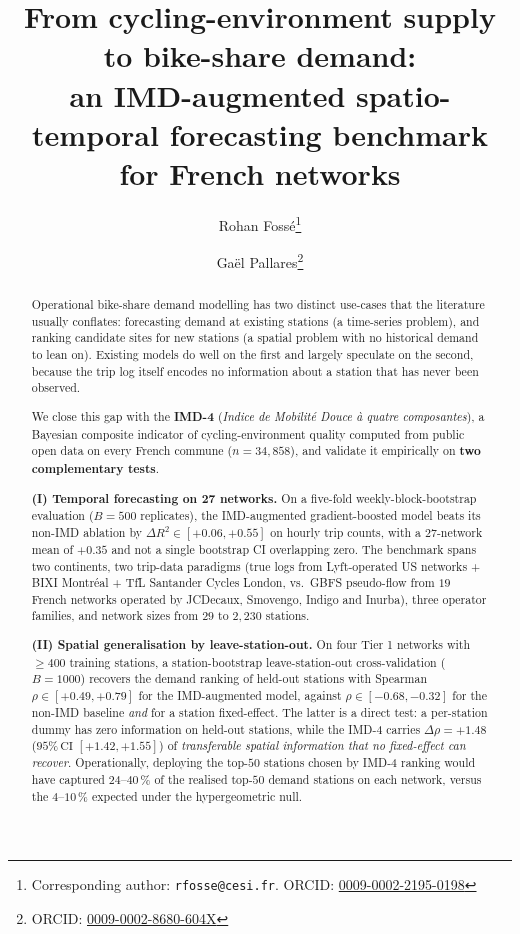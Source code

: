 \documentclass[11pt,a4paper]{article}
\title{\Large\bfseries From cycling-environment supply to bike-share demand:\\
\large an IMD-augmented spatio-temporal forecasting benchmark for
French networks}
\author[1]{Rohan Foss\'e\thanks{Corresponding author: \texttt{rfosse@cesi.fr}. ORCID: \href{https://orcid.org/0009-0002-2195-0198}{0009-0002-2195-0198}}}
\author[2]{Ga\"el Pallares\thanks{ORCID: \href{https://orcid.org/0009-0002-8680-604X}{0009-0002-8680-604X}}}
\affil[1]{CESI Engineering School, Montpellier, France}
\affil[2]{CESI LINEACT (EA 7527), Montpellier, France}
\date{}
\begin{document}
\maketitle

\begin{abstract}
\noindent
Operational bike-share demand modelling has two distinct
use-cases that the literature usually conflates: forecasting
demand at existing stations (a time-series problem), and ranking
candidate sites for new stations (a spatial problem with no
historical demand to lean on).  Existing models do well on the
first and largely speculate on the second, because the trip log
itself encodes no information about a station that has never
been observed.

We close this gap with the \textbf{IMD-4} (\emph{Indice de
Mobilit\'e Douce \`a quatre composantes}), a Bayesian composite
indicator of cycling-environment quality computed from public
open data on every French commune ($n = 34{,}858$), and validate
it empirically on \textbf{two complementary tests}.

\textbf{(I) Temporal forecasting on 27 networks.}  On a
five-fold weekly-block-bootstrap evaluation
($B = 500$ replicates), the IMD-augmented gradient-boosted model
beats its non-IMD ablation by $\Delta R^2 \in [+0.06, +0.55]$ on
hourly trip counts, with a $27$-network mean of $+0.35$ and not
a single bootstrap CI overlapping zero.  The benchmark spans two
continents, two trip-data paradigms (true logs from
Lyft-operated US networks + BIXI Montr\'eal + TfL Santander Cycles
London, vs.\ GBFS pseudo-flow from $19$ French networks operated
by JCDecaux, Smovengo, Indigo and Inurba), three operator
families, and network sizes from $29$ to $2{,}230$ stations.

\textbf{(II) Spatial generalisation by leave-station-out.}  On
four Tier 1 networks with $\geq 400$ training stations, a
station-bootstrap leave-station-out cross-validation
($B = 1000$) recovers the demand ranking of held-out stations
with Spearman $\rho \in [+0.49, +0.79]$ for the IMD-augmented
model, against $\rho \in [-0.68, -0.32]$ for the non-IMD
baseline \emph{and} for a station fixed-effect.  The latter is a
direct test: a per-station dummy has zero information on
held-out stations, while the IMD-4 carries
$\Delta \rho = +1.48$ ($95\%\,\mathrm{CI}$ $[+1.42, +1.55]$) of
\emph{transferable spatial information that no fixed-effect can
recover}.  Operationally, deploying the top-$50$ stations chosen
by IMD-4 ranking would have captured $24$--$40$\,\% of the
realised top-$50$ demand stations on each network, versus the
$4$--$10$\,\% expected under the hypergeometric null.


\end{abstract}
\end{document}
